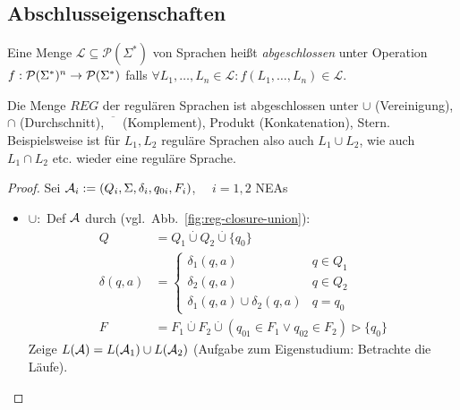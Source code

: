 {\subsection{Abschlusseigenschaften}
\begin{Def}[name={[Abgeschlossenheit von $\mathcal{L}$]}]
        Eine Menge $\mathcal{L}\subseteq \mathcal{P}(\Sigma^*)$ von Sprachen heißt \emph{abgeschlossen} unter Operation \\
        $f:\mathcal{P}(\Sigma^*)^n \-> \mathcal{P}(\Sigma^*)$ falls $\forall L_1,\dots, L_n\in \mathcal{L} : f(L_1,\dots, L_n)\in \mathcal{L}$.
\end{Def}
\begin{Satz}[name={[Abgeschlossenheit von $REG$]}]\label{satz:3.8}
        Die Menge $REG$ der regulären Sprachen ist abgeschlossen unter $\cup$ (Vereinigung), $\cap$ (Durchschnitt), $\overline{\phantom{X}}$ (Komplement), Produkt (Konkatenation), Stern. Beispielsweise ist für $L_1, L_2$ reguläre Sprachen also auch $L_1 \cup L_2$, wie auch $L_1 \cap L_2$ etc. wieder eine reguläre Sprache.
\end{Satz}
\begin{proof}
	Sei $\mathcal{A}_i:=(Q_i,\Sigma,\delta_i,q_{0i},F_i)$, $\quad i=1,2$ \acs{NEA}s
	\begin{itemize}
	\item $\cup:$ Def $\mathcal{A}$ durch (vgl.\ Abb.~\ref{fig:reg-closure-union}):
		\begin{align*}
			Q &= Q_1\overset.\cup Q_2\overset.\cup\{q_0\}\\
			\delta(q,a) &=
                \begin{cases}
                    \delta_1(q,a) & q\in Q_1\\
                    \delta_2(q,a) & q\in Q_2\\
                    \delta_1(q,a)\cup\delta_2(q,a) & q=q_0
                        \end{cases}\\
                        F &= F_1\overset.\cup F_2\overset.\cup (q_{01}\in F_1\lor q_{02}\in F_2) \rhd \{q_0\}
                \end{align*}
                Zeige $L(\mathcal{A})=L(\mathcal{A}_1)\cup L(\mathcal{A}_2)$ (Aufgabe zum Eigenstudium: Betrachte die Läufe).
                \begin{figure}[tp]\centering
\end{figure}
\end{itemize}
\end{proof}}

